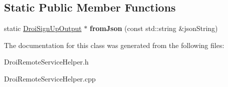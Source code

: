 \subsection*{Static Public Member Functions}
\begin{DoxyCompactItemize}
\item 
\mbox{\label{class_droi_sign_up_output_a4d2fbece93998b7f6b04ed5dbddb18f9}} 
static \hyperlink{class_droi_sign_up_output}{Droi\+Sign\+Up\+Output} $\ast$ {\bfseries from\+Json} (const std\+::string \&json\+String)
\end{DoxyCompactItemize}


The documentation for this class was generated from the following files\+:\begin{DoxyCompactItemize}
\item 
Droi\+Remote\+Service\+Helper.\+h\item 
Droi\+Remote\+Service\+Helper.\+cpp\end{DoxyCompactItemize}
